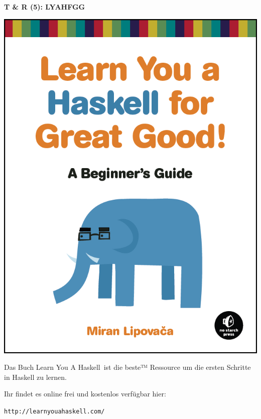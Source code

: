 \documentclass[unknownkeysallowed]{beamer}
\begin{document}
  \begin{frame}
    \Large\textbf{T \& R (5): LYAHFGG}\bigskip \normalsize
    
    \begin{multicols}{2}
    \begin{center}
	\includegraphics[scale=0.15]{lyah.png} 
	\end{center}
	
	\columnbreak    
    Das Buch \glqq Learn You A Haskell\grqq\ ist die beste™ Ressource um die ersten 
    Schritte in Haskell zu lernen. \bigskip
   
    Ihr findet es online frei und kostenlos verfügbar hier:
    
    \texttt{http://learnyouahaskell.com/}
    \end{multicols}
  \end{frame}
\end{document}
